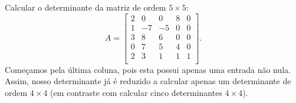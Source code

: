 \documentclass[../livro.tex]{subfiles}  %
\begin{document}
\begin{example}\label{exp:det2}
Calcular o determinante da matriz de ordem $5 \times 5$:
\begin{equation}
A = 
\begin{bmatrix}
2 & 0 & 0 & 8 & 0 \\
1 & -7 & -5 & 0 & 0 \\
3 & 8 & 6 & 0 & 0 \\
0 & 7 & 5 & 4 & 0 \\
2 & 3 & 1 & 1 & 1 \\
\end{bmatrix}.
\end{equation} Começamos pela última coluna, pois esta possui apenas uma entrada não nula. Assim, nosso determinante já é reduzido a calcular apenas um determinante de ordem $4 \times 4$ (em contraste com calcular cinco determinantes $4\times 4$).


\end{example}
\end{document}
